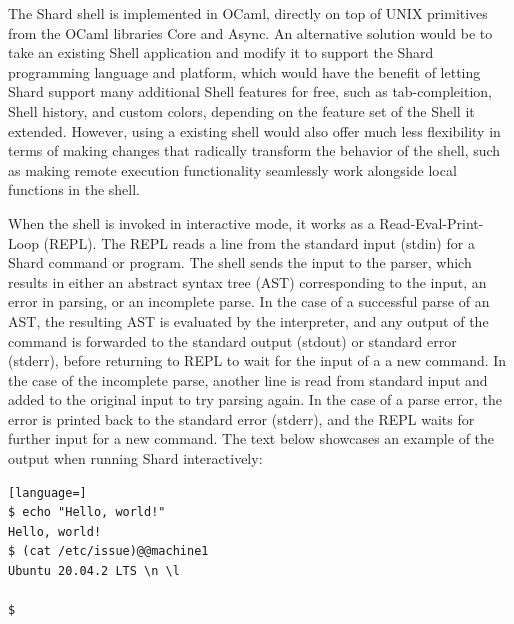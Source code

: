 \documentclass[twoside]{report}
\begin{document}

The Shard shell is implemented in OCaml, directly on top of UNIX primitives from the OCaml libraries Core and Async.
An alternative solution would be to take an existing Shell application and modify it to support the Shard programming language and platform, which would have the benefit of letting Shard support many additional Shell features for free, such as tab-compleition, Shell history, and custom colors, depending on the feature set of the Shell it extended.
However, using a existing shell would also offer much less flexibility in terms of making changes that radically transform the behavior of the shell, such as making remote execution functionality seamlessly work alongside local functions in the shell.

When the shell is invoked in interactive mode, it works as a Read-Eval-Print-Loop (REPL). The REPL reads a line from the standard input (stdin) for a Shard command or program. The shell sends the input to the parser, which results in either an abstract syntax tree (AST) corresponding to the input, an error in parsing, or an incomplete parse.
In the case of a successful parse of an AST, the resulting AST is evaluated by the interpreter, and any output of the command is forwarded to the standard output (stdout) or standard error (stderr), before returning to REPL to wait for the input of a a new command.
In the case of the incomplete parse, another line is read from standard input and added to the original input to try parsing again.
In the case of a parse error, the error is printed back to the standard error (stderr), and the REPL waits for further input for a new command.
The text below showcases an example of the output when running Shard interactively:

\begin{lstlisting}[language=]
$ echo "Hello, world!"
Hello, world!
$ (cat /etc/issue)@@machine1
Ubuntu 20.04.2 LTS \n \l

$
\end{lstlisting}
\end{document}
